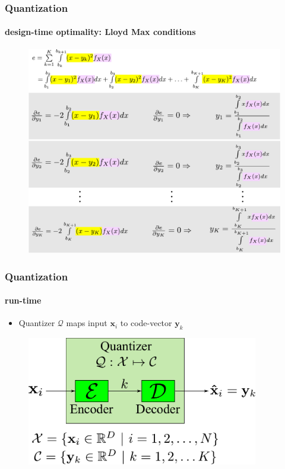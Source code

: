 \begin{frame}
\frametitle{Quantization}
\framesubtitle{design-time optimality: Lloyd Max conditions}
\mypagenum
\begin{figure}				
\includegraphics[height=0.75\textheight]{thesis/Quantization_optimalCodevectors.pdf}
\end{figure}
\end{frame}


\begin{frame}
\frametitle{Quantization}
\framesubtitle{run-time}
\mypagenum
\begin{itemize}
\item Quantizer $\mathcal{Q}$ maps input $\mathbf{x}_i$ to code-vector $\mathbf{y}_k$
\end{itemize}
\begin{figure}				
\includegraphics[width=0.9\textwidth]{thesis/Quantization_blockDiagram.pdf}
\end{figure}
\end{frame}




